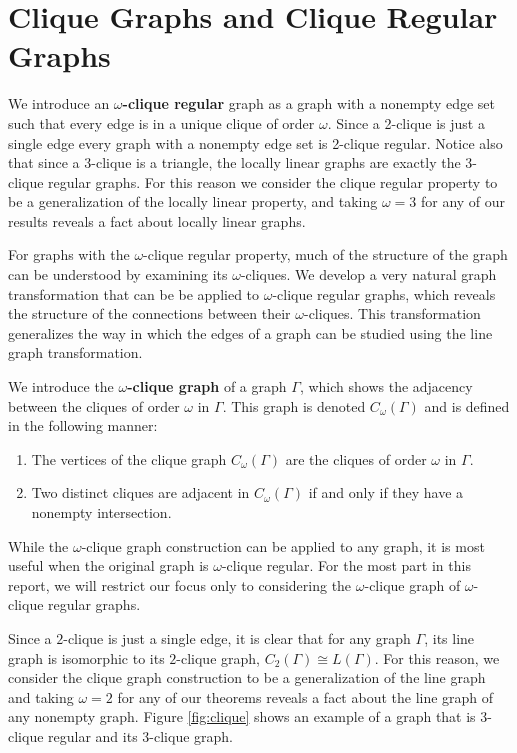 \documentclass[12pt]{report}
\theoremstyle{definition}
\begin{document}
\section{Clique Graphs and Clique Regular Graphs}
We introduce an \textbf{$\omega$-clique regular} graph as a graph with a nonempty edge set such that every edge is in a unique clique of order $\omega$. Since a 2-clique is just a single edge every graph with a nonempty edge set is 2-clique regular. Notice also that since a $3$-clique is a triangle, the locally linear graphs are exactly the 3-clique regular graphs. For this reason we consider the clique regular property to be a generalization of the locally linear property, and taking $\omega=3$ for any of our results reveals a fact about locally linear graphs.\par
For graphs with the $\omega$-clique regular property, much of the structure of the graph can be understood by examining its $\omega$-cliques. We develop a very natural graph transformation that can be be applied to $\omega$-clique regular graphs, which reveals the structure of the connections between their $\omega$-cliques. This transformation generalizes the way in which the edges of a graph can be studied using the line graph transformation. \par
We introduce the \textbf{$\omega$-clique graph} of a graph $\Gamma$, which shows the adjacency between the cliques of order $\omega$ in $\Gamma$. This graph is denoted $C_\omega(\Gamma)$ and is defined in the following manner:
\begin{enumerate}
    \item The vertices of the clique graph $C_\omega(\Gamma)$ are the cliques of order $\omega$ in $\Gamma$.
    \item Two distinct cliques are adjacent in $C_\omega(\Gamma)$ if and only if they have a nonempty intersection.
\end{enumerate}
While the $\omega$-clique graph construction can be applied to any graph, it is most useful when the original graph is $\omega$-clique regular. For the most part in this report, we will restrict our focus only to considering the $\omega$-clique graph of $\omega$-clique regular graphs.\par
Since a $2$-clique is just a single edge, it is clear that for any graph $\Gamma$, its line graph is isomorphic to its $2$-clique graph, $C_2(\Gamma) \cong L(\Gamma)$. For this reason, we consider the clique graph construction to be a generalization of the line graph and taking $\omega =2$ for any of our theorems reveals a fact about the line graph of any nonempty graph. Figure \ref{fig:clique} shows an example of a graph that is 3-clique regular and its 3-clique graph.\par
\end{document}
